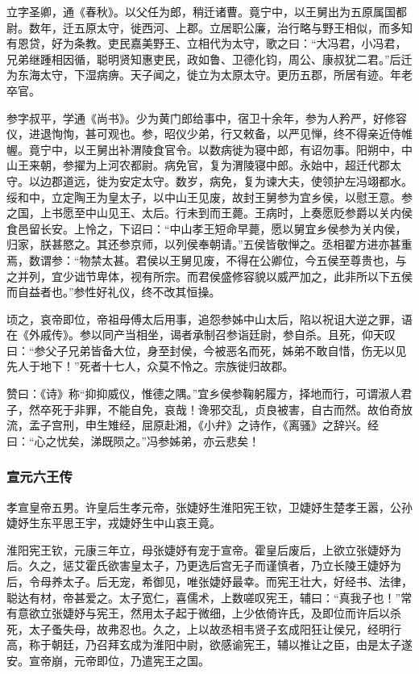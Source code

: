 \documentclass[]{article}
\begin{document}
立字圣卿，通《春秋》。以父任为郎，稍迁诸曹。竟宁中，以王舅出为五原属国都尉。数年，迁五原太守，徙西河、上郡。立居职公廉，治行略与野王相似，而多知有恩贷，好为条教。吏民嘉美野王、立相代为太守，歌之曰：``大冯君，小冯君，兄弟继踵相因循，聪明贤知惠吏民，政如鲁、卫德化钧，周公、康叔犹二君。''后迁为东海太守，下湿病痹。天子闻之，徙立为太原太守。更历五郡，所居有迹。年老卒官。

参字叔平，学通《尚书》。少为黄门郎给事中，宿卫十余年，参为人矜严，好修容仪，进退恂恂，甚可观也。参，昭仪少弟，行又敕备，以严见惮，终不得亲近侍帷幄。竟宁中，以王舅出补渭陵食官令。以数病徙为寝中郎，有诏勿事。阳朔中，中山王来朝，参擢为上河农都尉。病免官，复为渭陵寝中郎。永始中，超迁代郡太守。以边郡道远，徙为安定太守。数岁，病免，复为谏大夫，使领护左冯翊都水。绥和中，立定陶王为皇太子，以中山王见废，故封王舅参为宜乡侯，以慰王意。参之国，上书愿至中山见王、太后。行未到而王薨。王病时，上奏愿贬参爵以关内侯食邑留长安。上怜之，下诏曰：``中山孝王短命早薨，愿以舅宜乡侯参为关内侯，归家，朕甚愍之。其还参京师，以列侯奉朝请。''五侯皆敬惮之。丞相翟方进亦甚重焉，数谓参：``物禁太甚。君侯以王舅见废，不得在公卿位，今五侯至尊贵也，与之并列，宜少诎节卑体，视有所宗。而君侯盛修容貌以威严加之，此非所以下五侯而自益者也。''参性好礼仪，终不改其恒操。

顷之，哀帝即位，帝祖母傅太后用事，追怨参姊中山太后，陷以祝诅大逆之罪，语在《外戚传》。参以同产当相坐，谒者承制召参诣廷尉，参自杀。且死，仰天叹曰：``参父子兄弟皆备大位，身至封侯，今被恶名而死，姊弟不敢自惜，伤无以见先人于地下！''死者十七人，众莫不怜之。宗族徙归故郡。

赞曰：《诗》称``抑抑威仪，惟德之隅。''宜乡侯参鞠躬履方，择地而行，可谓淑人君子，然卒死于非罪，不能自免，哀哉！谗邪交乱，贞良被害，自古而然。故伯奇放流，孟子宫刑，申生雉经，屈原赴湘，《小弁》之诗作，《离骚》之辞兴。经曰：``心之忧矣，涕既陨之。''冯参姊弟，亦云悲矣！

\hypertarget{header-n5564}{%
\subsubsection{宣元六王传}\label{header-n5564}}

孝宣皇帝五男。许皇后生孝元帝，张婕妤生淮阳宪王钦，卫婕妤生楚孝王嚣，公孙婕妤生东平思王宇，戎婕妤生中山哀王竟。

淮阳宪王钦，元康三年立，母张婕妤有宠于宣帝。霍皇后废后，上欲立张婕妤为后。久之，惩艾霍氏欲害皇太子，乃更选后宫无子而谨慎者，乃立长陵王婕妤为后，令母养太子。后无宠，希御见，唯张婕妤最幸。而宪王壮大，好经书、法律，聪达有材，帝甚爱之。太子宽仁，喜儒术，上数嗟叹宪王，辅曰：``真我子也！''常有意欲立张婕妤与宪王，然用太子起于微细，上少依倚许氏，及即位而许后以杀死，太子蚤失母，故弗忍也。久之，上以故丞相韦贤子玄成阳狂让侯兄，经明行高，称于朝廷，乃召拜玄成为淮阳中尉，欲感谕宪王，辅以推让之臣，由是太子遂安。宣帝崩，元帝即位，乃遣宪王之国。
\end{document}
